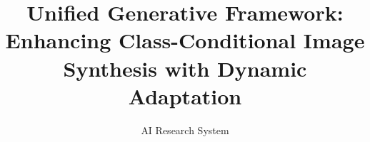 \documentclass{article} %
\title{Unified Generative Framework: \\Enhancing Class-Conditional Image \\Synthesis with Dynamic Adaptation}
\author{AI Research System}
\begin{document}
\maketitle

\begin{abstract}

\end{abstract}


















\end{document}
